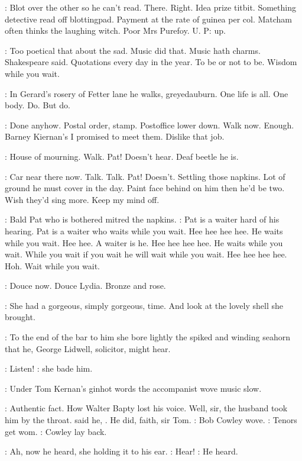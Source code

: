 \BloomInt:
Blot over the other so he can't read.
There.
Right.
Idea prize titbit.
Something detective read off blottingpad.
Payment at the rate of guinea
per col.
Matcham often thinks the laughing witch.
Poor Mrs Purefoy.
U.
P:
up.

\BloomInt:
Too poetical that about the sad.
Music did that.
Music hath charms.
Shakespeare said.
Quotations every day in the year.
To be or not to be.
Wisdom while you wait.

\BloomInt:
In Gerard's rosery of Fetter lane he walks,
greyedauburn.
One life is
all.
One body.
Do.
But do.

\BloomInt:
Done anyhow.
Postal order,
stamp.
Postoffice lower down.
Walk
now.
Enough.
Barney Kiernan's I promised to meet them.
Dislike that job.

\BloomInt:
House of mourning.
Walk.
Pat!
Doesn't hear.
Deaf beetle he is.

\BloomInt:
Car near there now.
Talk.
Talk.
Pat!
Doesn't.
Settling those napkins.
Lot of ground he must cover in the day.
Paint face behind on him then he'd
be two.
Wish they'd sing more.
Keep my mind off.

:
Bald Pat who is bothered mitred the napkins.
\BloomInt:
Pat is a waiter hard of
his hearing.
Pat is a waiter who waits while you wait.
Hee hee hee hee.
He
waits while you wait.
Hee hee.
A waiter is he.
Hee hee hee hee.
He waits
while you wait.
While you wait if you wait he will wait while you wait.
Hee hee hee hee.
Hoh.
Wait while you wait.

:
Douce now.
Douce Lydia.
Bronze and rose.

:
She had a gorgeous,
simply gorgeous,
time.
And look at the lovely
shell she brought.

:
To the end of the bar to him she bore lightly the spiked and winding
seahorn that he,
George Lidwell,
solicitor,
might hear.

\MissD:
Listen!
:
she bade him.

:
Under Tom Kernan's ginhot words the accompanist wove music slow.

\BloomInt:
Authentic fact.
How Walter Bapty lost his voice.
Well,
sir,
the husband took him by the throat.
said he,
.
He did,
faith,
sir Tom.
:
Bob Cowley wove.
\BloomInt:
Tenors get wom.
:
Cowley lay back.

:
Ah,
now he heard,
she holding it to his ear.
\MissD:
Hear!
:
He heard.

